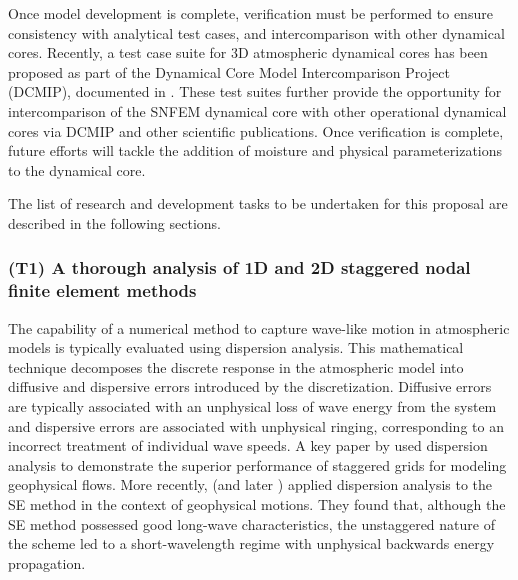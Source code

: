 \documentclass[11pt]{article}
\begin{document}
Once model development is complete, verification must be performed to ensure consistency with analytical test cases, and intercomparison with other dynamical cores.  Recently, a test case suite for 3D atmospheric dynamical cores has been proposed as part of the Dynamical Core Model Intercomparison Project (DCMIP), documented in \cite{DCMIP2012TESTCASES, kent2013dynamical}.  These test suites further provide the opportunity for intercomparison of the SNFEM dynamical core with other operational dynamical cores via DCMIP and other scientific publications.  Once verification is complete, future efforts will tackle the addition of moisture and physical parameterizations to the dynamical core.

The list of research and development tasks to be undertaken for this proposal are described in the following sections.

\subsubsection{(T1) A thorough analysis of 1D and 2D staggered nodal finite element methods} \label{sec:AnalysisSNFEM}


The capability of a numerical method to capture wave-like motion in atmospheric models is typically evaluated using dispersion analysis.  This mathematical technique decomposes the discrete response in the atmospheric model into diffusive and dispersive errors introduced by the discretization.  Diffusive errors are typically associated with an unphysical loss of wave energy from the system and dispersive errors are associated with unphysical ringing, corresponding to an incorrect treatment of individual wave speeds.  A key paper by \cite{randall1994geostrophic} used dispersion analysis to demonstrate the superior performance of staggered grids for modeling geophysical flows.  More recently, \cite{MAHAW2009SIAMJNA} (and later \cite{melvin2012dispersion}) applied dispersion analysis to the SE method in the context of geophysical motions.  They found that, although the SE method possessed good long-wave characteristics, the unstaggered nature of the scheme led to a short-wavelength regime with unphysical backwards energy propagation.
\end{document}
